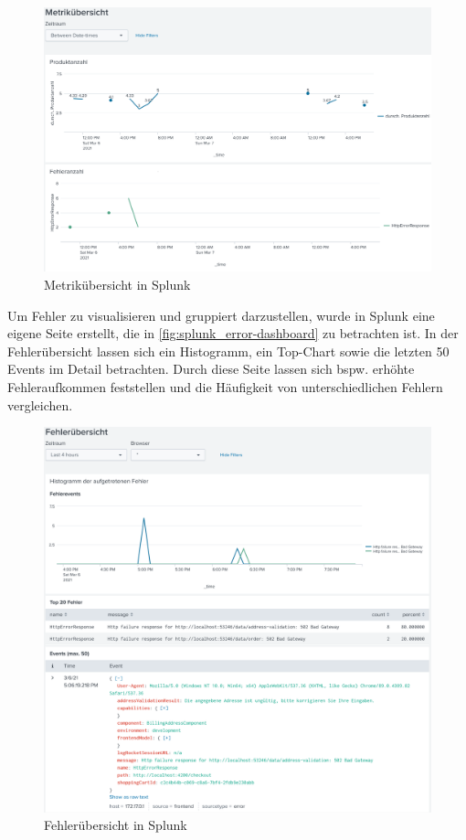 \begin{figure}[H]
	\centering
	\includegraphics[width=1.00\linewidth]{img/99_postscript/splunk_metric-overview.png}
	\caption{Metrikübersicht in Splunk}
	\label{fig:splunk_metric-overview}
\end{figure}

Um Fehler zu visualisieren und gruppiert darzustellen, wurde in Splunk eine eigene Seite erstellt, die in \autoref{fig:splunk_error-dashboard} zu betrachten ist. In der Fehlerübersicht lassen sich ein Histogramm, ein Top-Chart sowie die letzten 50 Events im Detail betrachten. Durch diese Seite lassen sich bspw. erhöhte Fehleraufkommen feststellen und die Häufigkeit von unterschiedlichen Fehlern vergleichen.

\begin{figure}[H]
	\centering
	\includegraphics[width=1.00\linewidth]{img/99_postscript/splunk_error-dashboard.png}
	\caption{Fehlerübersicht in Splunk}
	\label{fig:splunk_error-dashboard}
\end{figure}

